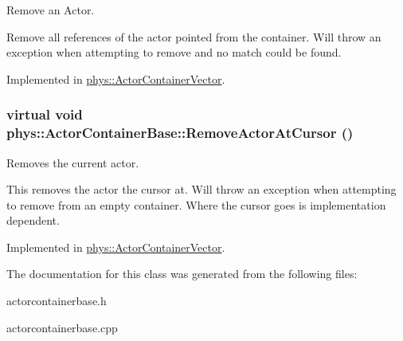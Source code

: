Remove an Actor. 

Remove all references of the actor pointed from the container. Will throw an exception when attempting to remove and no match could be found. 

Implemented in \hyperlink{classphys_1_1ActorContainerVector_aeee5bd81601faed85e6a35f576c8d476}{phys::ActorContainerVector}.

\hypertarget{classphys_1_1ActorContainerBase_a60f37a056e8750f3b389c5ceed14520c}{
\subsubsection[{RemoveActorAtCursor}]{\setlength{\rightskip}{0pt plus 5cm}virtual void phys::ActorContainerBase::RemoveActorAtCursor ()}}
\label{d1/d00/classphys_1_1ActorContainerBase_a60f37a056e8750f3b389c5ceed14520c}


Removes the current actor. 

This removes the actor the cursor at. Will throw an exception when attempting to remove from an empty container. Where the cursor goes is implementation dependent. 

Implemented in \hyperlink{classphys_1_1ActorContainerVector_a430977daf010a25f53df6cf37954f8ca}{phys::ActorContainerVector}.



The documentation for this class was generated from the following files:\begin{DoxyCompactItemize}
\item 
actorcontainerbase.h\item 
actorcontainerbase.cpp\end{DoxyCompactItemize}
